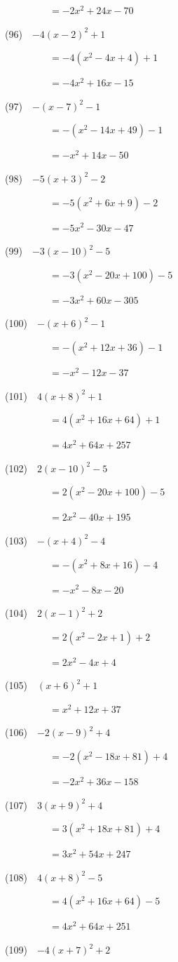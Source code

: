 \documentclass[a4j,twocolumn,10pt,fleqn]{jarticle}
\begin{document}
~~~~~~~~~$=-2x^2 +24x-70$

(96)~~$-4(x-2)^2 +1$

~~~~~~~~~$=-4(x^2-4x +4) +1$

~~~~~~~~~$=-4x^2 +16x-15$

(97)~~$-(x-7)^2-1$

~~~~~~~~~$=-(x^2-14x +49)-1$

~~~~~~~~~$=-x^2 +14x-50$

(98)~~$-5(x +3)^2-2$

~~~~~~~~~$=-5(x^2 +6x +9)-2$

~~~~~~~~~$=-5x^2-30x-47$

(99)~~$-3(x-10)^2-5$

~~~~~~~~~$=-3(x^2-20x +100)-5$

~~~~~~~~~$=-3x^2 +60x-305$

(100)~~$-(x +6)^2-1$

~~~~~~~~~$=-(x^2 +12x +36)-1$

~~~~~~~~~$=-x^2-12x-37$

(101)~~$4(x +8)^2 +1$

~~~~~~~~~$=4(x^2 +16x +64) +1$

~~~~~~~~~$=4x^2 +64x +257$

(102)~~$2(x-10)^2-5$

~~~~~~~~~$=2(x^2-20x +100)-5$

~~~~~~~~~$=2x^2-40x +195$

(103)~~$-(x +4)^2-4$

~~~~~~~~~$=-(x^2 +8x +16)-4$

~~~~~~~~~$=-x^2-8x-20$

(104)~~$2(x-1)^2 +2$

~~~~~~~~~$=2(x^2-2x +1) +2$

~~~~~~~~~$=2x^2-4x +4$

(105)~~$(x +6)^2 +1$

~~~~~~~~~$=x^2 +12x +37$

(106)~~$-2(x-9)^2 +4$

~~~~~~~~~$=-2(x^2-18x +81) +4$

~~~~~~~~~$=-2x^2 +36x-158$

(107)~~$3(x +9)^2 +4$

~~~~~~~~~$=3(x^2 +18x +81) +4$

~~~~~~~~~$=3x^2 +54x +247$

(108)~~$4(x +8)^2-5$

~~~~~~~~~$=4(x^2 +16x +64)-5$

~~~~~~~~~$=4x^2 +64x +251$

(109)~~$-4(x +7)^2 +2$
\end{document}

